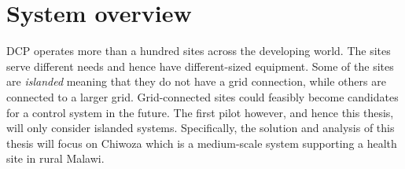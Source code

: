 \section{System overview}
DCP operates more than a hundred sites across the developing world. The sites serve different needs and hence have different-sized equipment. Some of the sites are \textit{islanded} meaning that they do not have a grid connection, while others are connected to a larger grid. Grid-connected sites could feasibly become candidates for a control system in the future. The first pilot however, and hence this thesis, will only consider islanded systems. Specifically, the solution and analysis of this thesis will focus on Chiwoza which is a medium-scale system supporting a health site in rural Malawi.\\

